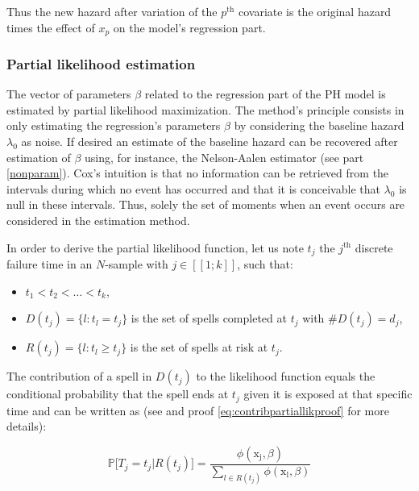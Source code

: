 \documentclass[
]{book}
\providecommand{\tightlist}{%
  \setlength{\itemsep}{0pt}\setlength{\parskip}{0pt}}
\begin{document}
Thus the new hazard after variation of the \(p^{\text{th}}\) covariate is the original hazard times the effect of \(x_p\) on the model's regression part.

\hypertarget{partial-likelihood-estimation}{%
\subsubsection*{Partial likelihood estimation}\label{partial-likelihood-estimation}}

The vector of parameters \(\beta\) related to the regression part of the PH model is estimated by partial likelihood maximization. The method's principle consists in only estimating the regression's parameters \(\beta\) by considering the baseline hazard \(\lambda_0\) as noise. If desired an estimate of the baseline hazard can be recovered after estimation of \(\beta\) using, for instance, the Nelson-Aalen estimator (see part \ref{nonparam}). Cox's intuition is that no information can be retrieved from the intervals during which no event has occurred and that it is conceivable that \(\lambda_0\) is null in these intervals. Thus, solely the set of moments when an event occurs are considered in the estimation method.

In order to derive the partial likelihood function, let us note \(t_j\) the \(j^{\text{th}}\) discrete failure time in an \(N\)-sample with \(j \in [\![1; k]\!]\), such that:

\begin{itemize}
\tightlist
\item
  \(t_1 < t_2 < \dots < t_k\),
\item
  \(D(t_j) = \{l: t_l = t_j\}\) is the set of spells completed at \(t_j\) with \(\#D(t_j) = d_j\),
\item
  \(R(t_j) = \{l: t_l \geq t_j\}\) is the set of spells at risk at \(t_j\).
\end{itemize}

The contribution of a spell in \(D(t_j)\) to the likelihood function equals the conditional probability that the spell ends at \(t_j\) given it is exposed at that specific time and can be written as (see \citet{CAMERON_TRIVEDI} and proof \eqref{eq:contribpartiallikproof} for more details):

\begin{equation}
  \mathbb{P}\big[T_j = t_j | R(t_j) \big] = \frac{\phi(\mathrm{x_j}, \beta)}{\sum_{l \in R(t_j)} \phi(\mathrm{x_l}, \beta)}
  \label{eq:contribpartiallik}
\end{equation}
\end{document}
